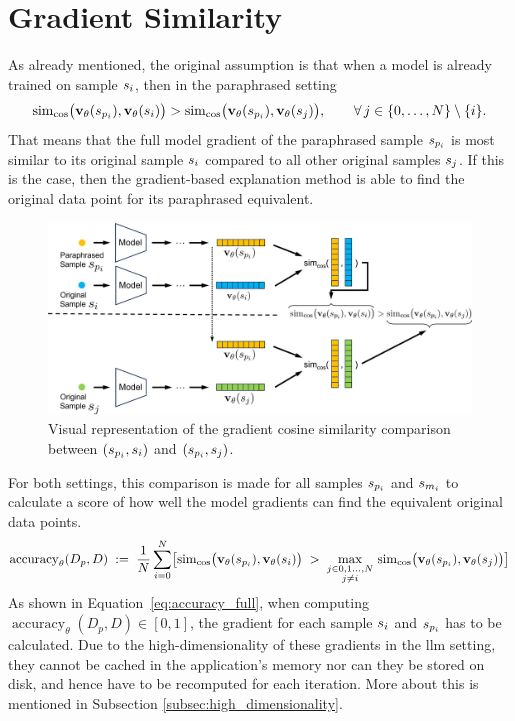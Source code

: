 \section{Gradient Similarity}
As already mentioned, the original assumption is that when a model is already trained on sample $s_i$, then in the paraphrased setting
\begin{equation}
    \operatorname{sim}_{\cos} \bigl( \mathbf{v}_{\theta}(s_{p_i}), \mathbf{v}_{\theta}(s_i) \bigr) > \operatorname{sim}_{\cos} \bigl( \mathbf{v}_{\theta}(s_{p_i}), \mathbf{v}_{\theta}(s_j) \bigr), \qquad \forall\,j\in\{0,\dots,N\}\setminus\{i\}.
    \label{eq:cosine_similarity_paraphrased}
\end{equation}
That means that the full model gradient of the paraphrased sample $s_{p_i}$ is most similar to its original sample $s_i$ compared to all other original samples $s_j$. If this is the case, then the gradient-based explanation method is able to find the original data point for its paraphrased equivalent. 
\begin{figure}[ht]
    \centering
    \includegraphics[width=1\textwidth]{figures/gradient_cosine_similarity.png}
    \caption{Visual representation of the gradient cosine similarity comparison between $(s_{p_i}, s_i)$ and $(s_{p_i}, s_j)$.}
    \label{fig:gradient_cosine_similarity}
\end{figure}
For both settings, this comparison is made for all samples $s_{p_i}$ and $s_{m_i}$ to calculate a score of how well the model gradients can find the equivalent original data points. 
\begin{equation}
\operatorname{accuracy}_\theta(D_p, D)
\;:=\;
\frac{1}{N}\sum_{i=0}^{N}
\bigl[
  \operatorname{sim}_{\cos} \bigl( \mathbf{v}_{\theta}(s_{p_i}),\mathbf{v}_{\theta}(s_i) \bigr)
  \;>\;
  \max_{\substack{j \in 0,1\dots,N  \\j \neq i}}\,
  \operatorname{sim}_{\cos} \bigl( \mathbf{v}_{\theta}(s_{p_i}),\mathbf{v}_{\theta}(s_j) \bigr)
\bigr]
\label{eq:accuracy_full}
\end{equation}
As shown in Equation~\ref{eq:accuracy_full}, when computing $\operatorname{accuracy}_\theta(D_p, D) \in [0,1]$, the gradient for each sample $s_i$ and $s_{p_i}$ has to be calculated. Due to the high-dimensionality of these gradients in the \acrshort{llm} setting, they cannot be cached in the application's memory nor can they be stored on disk, and hence have to be recomputed for each iteration. More about this is mentioned in Subsection \ref{subsec:high_dimensionality}.

